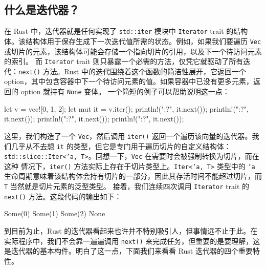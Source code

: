 \subsection{什么是迭代器？}
\label{idx:idx_a2eacbc0}
在 Rust 中，迭代器就是任何实现了 \texttt{std::iter} 模块中 \texttt{Iterator} trait 的结构体。该结构体用于保存生成下一次迭代值所需的状态。例如，如果我们要遍历 \texttt{Vec} 或切片的元素，该结构体可能会存储一个指向切片的引用，以及下一个待访问元素的索引。
而 \texttt{Iterator} trait 则只暴露一个必需的方法，仅凭它就驱动了所有迭代：\texttt{next()} 方法。Rust 中的迭代围绕着这个函数的简洁性展开，它返回一个 option，其中包含容器中下一个待访问元素的值。如果容器中已没有更多元素，返回的 option 就持有 \texttt{None} 变体。
一个简短的例子可以帮助说明这一点：
\begin{codebox}[rust]
let v = vec![0, 1, 2];
let mut it = v.iter();
println!("{:?}", it.next());
println!("{:?}", it.next());
println!("{:?}", it.next());
println!("{:?}", it.next());
\end{codebox}
这里，我们构造了一个 \texttt{Vec}，然后调用 \texttt{iter()} 返回一个遍历该向量的迭代器。我们几乎从不去想 \texttt{it} 的类型，但它是专门用于遍历切片的自定义结构体：
\texttt{std::\allowbreak{}slice::\allowbreak{}Iter<\allowbreak{}'a,\allowbreak{} T>\allowbreak{}}。回想一下，\texttt{Vec} 在需要时会被强制转换为切片，而在这种
情况下，\texttt{iter()} 方法实际上存在于切片类型上。\texttt{Iter<'a, T>} 类型中的 \texttt{'a} 生命周期意味着该结构体会持有切片的一部分，因此其存活时间不能超过切片，而 \texttt{T} 当然就是切片元素的泛型类型。
接着，我们连续四次调用 \texttt{Iterator} trait 的 \texttt{next()} 方法。这段代码的输出如下：
\begin{codeboxdark}
Some(0)
Some(1)
Some(2)
None
\end{codeboxdark}
到目前为止，Rust 的迭代器看起来也许并不特别吸引人，但事情远不止于此。在实际程序中，我们不会靠一遍遍调用 \texttt{next()} 来完成任务，但重要的是要理解，这是迭代器的基本构件。明白了这一点，下面我们来看看 Rust 迭代器的四个重要特性。
